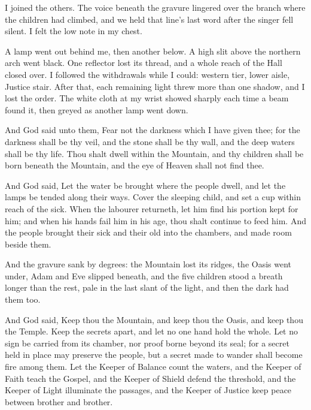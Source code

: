 I joined the others. The voice beneath the gravure lingered over the branch where the children had climbed, and we held that line's last word after the singer fell silent. I felt the low note in my chest.\par

A lamp went out behind me, then another below. A high slit above the northern arch went black. One reflector lost its thread, and a whole reach of the Hall closed over. I followed the withdrawals while I could: western tier, lower aisle, Justice stair. After that, each remaining light threw more than one shadow, and I lost the order. The white cloth at my wrist showed sharply each time a beam found it, then greyed as another lamp went down.\par

\begin{scripture}
And God said unto them, Fear not the darkness which I have given thee; for the darkness shall be thy veil, and the stone shall be thy wall, and the deep waters shall be thy life. Thou shalt dwell within the Mountain, and thy children shall be born beneath the Mountain, and the eye of Heaven shall not find thee.

And God said, Let the water be brought where the people dwell, and let the lamps be tended along their ways. Cover the sleeping child, and set a cup within reach of the sick. When the labourer returneth, let him find his portion kept for him; and when his hands fail him in his age, thou shalt continue to feed him. And the people brought their sick and their old into the chambers, and made room beside them.
\end{scripture}

And the gravure sank by degrees: the Mountain lost its ridges, the Oasis went under, Adam and Eve slipped beneath, and the five children stood a breath longer than the rest, pale in the last slant of the light, and then the dark had them too.\par

\begin{scripture}
And God said, Keep thou the Mountain, and keep thou the Oasis, and keep thou the Temple. Keep the secrets apart, and let no one hand hold the whole. Let no sign be carried from its chamber, nor proof borne beyond its seal; for a secret held in place may preserve the people, but a secret made to wander shall become fire among them. Let the Keeper of Balance count the waters, and the Keeper of Faith teach the Gospel, and the Keeper of Shield defend the threshold, and the Keeper of Light illuminate the passages, and the Keeper of Justice keep peace between brother and brother.
\end{scripture}

